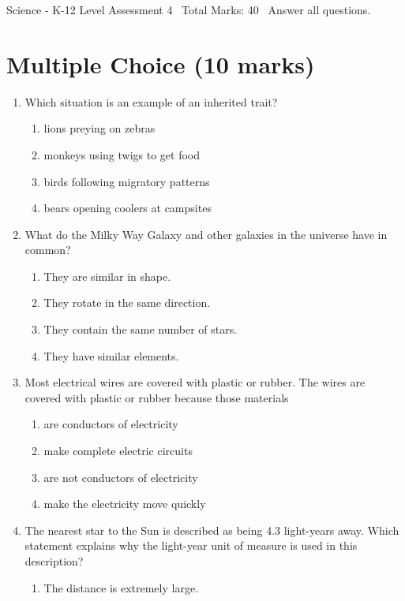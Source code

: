 \documentclass[12pt]{article}
\begin{document}
\begin{center}
Science - K-12 Level Assessment 4 \
Total Marks: 40 \
Answer all questions.
\end{center}

\section*{Multiple Choice (10 marks)}
\begin{enumerate}[label=\arabic*.]
\item Which situation is an example of an inherited trait?
\begin{enumerate}[label=(\alph*)]
    \item lions preying on zebras
    \item monkeys using twigs to get food
    \item birds following migratory patterns
    \item bears opening coolers at campsites
\end{enumerate}
\item What do the Milky Way Galaxy and other galaxies in the universe have in common?
\begin{enumerate}[label=(\alph*)]
    \item They are similar in shape.
    \item They rotate in the same direction.
    \item They contain the same number of stars.
    \item They have similar elements.
\end{enumerate}
\item Most electrical wires are covered with plastic or rubber. The wires are covered with plastic or rubber because those materials
\begin{enumerate}[label=(\alph*)]
    \item are conductors of electricity
    \item make complete electric circuits
    \item are not conductors of electricity
    \item make the electricity move quickly
\end{enumerate}
\item The nearest star to the Sun is described as being 4.3 light-years away. Which statement explains why the light-year unit of measure is used in this description?
\begin{enumerate}[label=(\alph*)]
    \item The distance is extremely large.

\end{enumerate}
\end{enumerate}
\end{document}
